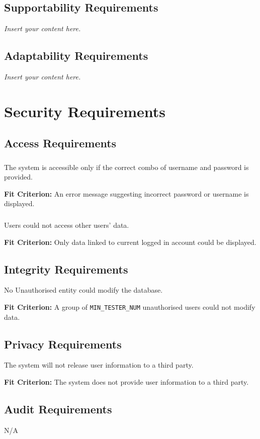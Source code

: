 \documentclass[12pt]{article}
\newcommand{\lips}{\textit{Insert your content here.}}
\begin{document}
\subsection{Supportability Requirements}
\lips
\subsection{Adaptability Requirements}
\lips

\section{Security Requirements}
\subsection{Access Requirements}
\subsubsection{}
The system is accessible only if the correct combo of username and password is provided.

\textbf{Fit Criterion:} An error message suggesting incorrect password or username is displayed.
\subsubsection{}
Users could not access other users' data.

\textbf{Fit Criterion:} Only data linked to current logged in account could be displayed.
\subsection{Integrity Requirements}
No Unauthorised entity could modify the database.

\textbf{Fit Criterion:} A group of \texttt{MIN\_TESTER\_NUM} unauthorised users could not modify data.
\subsection{Privacy Requirements}

The system will not release user information to a third party.

\textbf{Fit Criterion:} The system does not provide user information to a third party.
\subsection{Audit Requirements}
N/A
\end{document}
